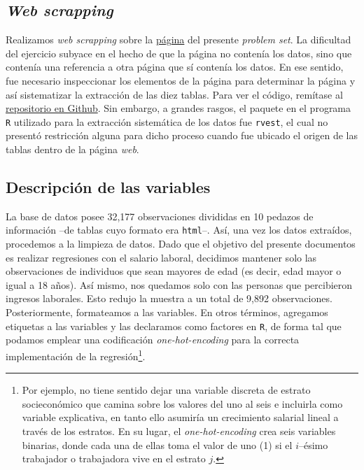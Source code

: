 \subsection{\textit{Web scrapping}}
Realizamos \textit{web scrapping} sobre la \href{https://ignaciomsarmiento.github.io/GEIH2018_sample/}{página} del presente \textit{problem set}. La dificultad del ejercicio subyace en el hecho de que la página no contenía los datos, sino que contenía una referencia a otra página que sí contenía los datos. En ese sentido, fue necesario inspeccionar los elementos de la página para determinar la página y así sistematizar la extracción de las diez tablas. Para ver el código, remítase al \href{https://github.com/pisco-rolo/PS_1_ML}{repositorio en Github}. Sin embargo, a grandes rasgos, el paquete en el programa \texttt{R} utilizado para la extracción sistemática de los datos fue \texttt{rvest}, el cual no presentó restricción alguna para dicho proceso cuando fue ubicado el origen de las tablas dentro de la página \textit{web}.

\subsection{Descripción de las variables}
La base de datos posee 32,177 observaciones divididas en 10 pedazos de información --de tablas cuyo formato era \texttt{html}--.  Así, una vez los datos extraídos, procedemos a la limpieza de datos. Dado que el objetivo del presente documentos es realizar regresiones con el salario laboral, decidimos mantener solo las observaciones de individuos que sean mayores de edad (es decir, edad mayor o igual a 18 años). Así mismo, nos quedamos solo con las personas que percibieron ingresos laborales. Esto redujo la muestra a un total de 9,892 observaciones. Posteriormente, formateamos a las variables. En otros términos, agregamos etiquetas a las variables y las declaramos como factores en \texttt{R}, de forma tal que podamos emplear una codificación \textit{one-hot-encoding} para la correcta implementación de la regresión\footnote{Por ejemplo, no tiene sentido dejar una variable discreta de estrato socieconómico que camina sobre los valores del uno al seis e incluirla como variable explicativa, en tanto ello asumiría un crecimiento salarial lineal a través de los estratos. En su lugar, el \textit{one-hot-encoding} crea seis variables binarias, donde cada una de ellas toma el valor de uno (1) si el $i$--ésimo trabajador o trabajadora vive en el estrato $j$.}. 

